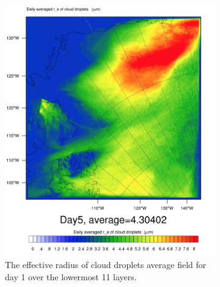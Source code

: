 \begin{figure}[h]
\centering
	\begin{subfigure}{0.48\textwidth}
		\centering
		\includegraphics[width=\textwidth]{results/control/recloud_cont_day5.png}
		\caption{The effective radius of cloud droplets average field for day 1 over the lowermost 11 layers.}
		\label{subfig:recloud_r1Day1}
	\end{subfigure}
	\begin{subfigure}{0.48\textwidth}
		\centering

\end{subfigure}
\end{figure}
